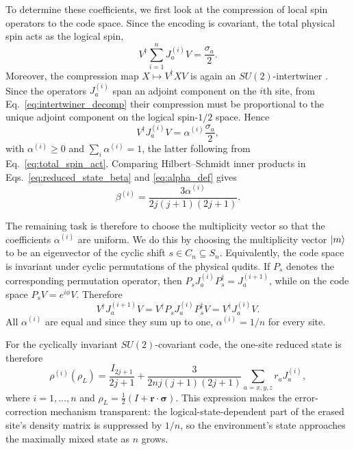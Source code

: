 \documentclass[10pt,twocolumn,superscriptaddress,aps,amsmath,amssymb,citeautoscript,floatfix,prx,longbibliography]{revtex4-2}
\theoremstyle{plain}
\theoremstyle{plain}
\theoremstyle{plain}
\theoremstyle{plain}
\theoremstyle{plain}
\theoremstyle{plain}
\begin{document}
To determine these coefficients, we first look at the compression of local spin operators to the code space. Since the encoding is covariant, the total physical spin acts as the logical spin,
\begin{equation}\label{eq:total_spin_act}
    V^\dagger \sum_{i=1}^n J_a^{(i)} V
    =
    \frac{\sigma_a}{2} .
\end{equation}
Moreover, the compression map $X\mapsto V^\dagger X V$ is again an $SU(2)$-intertwiner . Since the operators $J_a^{(i)}$ span an adjoint component on the $i$th site, from Eq.~\eqref{eq:intertwiner_decomp} their compression must be proportional to the unique adjoint component on the logical spin-$1/2$ space. Hence
\begin{equation}\label{eq:alpha_def}
    V^\dagger J_a^{(i)} V
    =
    \alpha^{(i)}\frac{\sigma_a}{2},
\end{equation}
with $\alpha^{(i)}\ge 0$ and $\sum_i\alpha^{(i)}=1$, the latter following from Eq.~\eqref{eq:total_spin_act}. Comparing Hilbert--Schmidt inner products in Eqs.~\eqref{eq:reduced_state_beta} and \eqref{eq:alpha_def} gives
\begin{equation}\label{eq:beta_through_alpha}
    \beta^{(i)}
    =
    \frac{3\alpha^{(i)}}{2j(j+1)(2j+1)} .
\end{equation}

The remaining task is therefore to choose the multiplicity vector so that the coefficients $\alpha^{(i)}$ are uniform. We do this by choosing the multiplicity vector $\ket m$ to be an eigenvector of the cyclic shift $s\in C_n\subseteq S_n$. Equivalently, the code space is invariant under cyclic permutations of the physical qudits. If $P_s$ denotes the corresponding permutation operator, then $P_s J_a^{(i)}P_s^\dagger=J_a^{(i+1)}$, while on the code space $P_s V=e^{i\phi}V$. Therefore
\[
    V^\dagger J_a^{(i+1)}V
    =
    V^\dagger P_sJ_a^{(i)}P_s^\dagger V
    =
    V^\dagger J_a^{(i)}V .
\]
All $\alpha^{(i)}$ are equal and since they sum up to one, $\alpha^{(i)}=1/n$ for every site.

For the cyclically invariant $SU(2)$-covariant code, the one-site reduced state is therefore
\begin{equation}\label{eq:reduced_state_su2}
    \rho^{(i)}(\rho_L)
    =
    \frac{I_{2j+1}}{2j+1}
    +
    \frac{3}{2nj(j+1)(2j+1)}
    \sum_{a=x,y,z} r_a J_a^{(i)},
\end{equation}
where $i=1,\ldots,n$ and $\rho_L=\frac12(I+\mathbf r\cdot\boldsymbol\sigma)$. This expression makes the error-correction mechanism transparent: the logical-state-dependent part of the erased site's density matrix is suppressed by $1/n$, so the environment's state approaches the maximally mixed state as $n$ grows.
\end{document}
